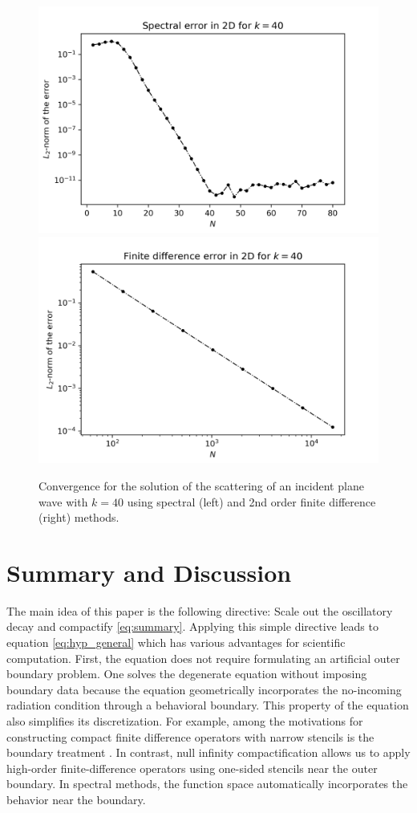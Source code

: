 \documentclass[final,onefignum,onetabnum]{siamart190516}
\begin{document}
\begin{figure}[tbhp]
	\centering
	\includegraphics[scale=0.41]{figs/spectral_2d.png}
	\includegraphics[scale=0.41]{figs/fd_2d.png}
	\caption{Convergence for the solution of the scattering of an incident plane wave with $k=40$ using spectral (left) and 2nd order finite difference (right) methods. }
	\label{fig:twod_scattering}
\end{figure}

\section{Summary and Discussion}
The main idea of this paper is the following directive: Scale out the oscillatory decay and compactify \eqref{eq:summary}. Applying this simple directive leads to equation \eqref{eq:hyp_general} which has various advantages for scientific computation. First, the equation does not require formulating an artificial outer boundary problem. One solves the degenerate equation without imposing boundary data because the equation geometrically incorporates the no-incoming radiation condition through a behavioral boundary. This property of the equation also simplifies its discretization. For example, among the motivations for constructing compact finite difference operators with narrow stencils is the boundary treatment \cite{britt2010compact}. In contrast, null infinity compactification allows us to apply high-order finite-difference operators using one-sided stencils near the outer boundary. In spectral methods, the function space automatically incorporates the behavior near the boundary.
\end{document}
